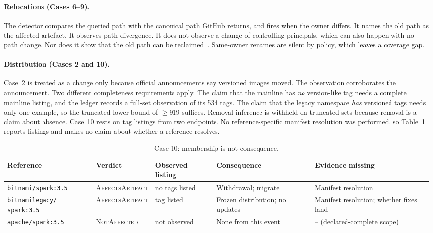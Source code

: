 \documentclass[11pt,a4paper]{article}
\newcommand{\code}[1]{\texttt{#1}}
\begin{document}
\paragraph{Relocations (Cases 6--9).} The detector compares the queried
path with the canonical path GitHub returns, and fires when the owner
differs. It names the old path as the affected artefact. It observes
path divergence. It does not observe a change of controlling
principals, which can also happen with no path change. Nor does it
show that the old path can be reclaimed~\cite{github2026transfer}.
Same-owner renames are silent by policy, which leaves a coverage gap.

\paragraph{Distribution (Cases 2 and 10).} Case~2 is treated as a
change only because official announcements say versioned images moved.
The observation corroborates the announcement. Two different
completeness requirements apply. The claim that the mainline has
\emph{no} version-like tag needs a complete mainline listing, and the
ledger records a full-set observation of its 534 tags. The claim that
the legacy namespace \emph{has} versioned tags needs only one example,
so the truncated lower bound of $\ge$919 suffices. Removal inference
is withheld on truncated sets because removal is a claim about
absence. Case~10 rests on tag listings from two endpoints. No
reference-specific manifest resolution was performed, so
Table~\ref{tab:spark} reports listings and makes no claim about
whether a reference resolves.

\begin{table}[t]
\centering
\footnotesize
\begin{tabularx}{\linewidth}{@{}>{\raggedright\arraybackslash}p{2.9cm} >{\raggedright\arraybackslash}p{2.0cm} >{\raggedright\arraybackslash}p{1.8cm} >{\raggedright\arraybackslash}X >{\raggedright\arraybackslash}X@{}}
\toprule
Reference & Verdict & Observed listing & Consequence & Evidence missing \\
\midrule
\code{bitnami/spark:3.5} & \textsc{Affects\-Artifact} & no tags listed &
  Withdrawal; migrate & Manifest resolution \\
\code{bitnamilegacy/} \code{spark:3.5} & \textsc{Affects\-Artifact} & tag
  listed & Frozen distribution; no updates & Manifest resolution;
  whether fixes land \\
\code{apache/spark:3.5} & \textsc{Not\-Affected} & not observed & None
  from this event & -- (declared-complete scope) \\
\bottomrule
\end{tabularx}
\caption{Case 10: membership is not consequence.}
\label{tab:spark}
\end{table}
\end{document}
